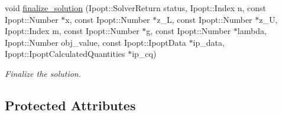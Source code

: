 \begin{DoxyCompactItemize}
void \mbox{\hyperlink{classSuperQuadric__NLP_a2f0b1fc45d42b0ee77c343ea7c227874}{finalize\+\_\+solution}} (Ipopt\+::\+Solver\+Return status, Ipopt\+::\+Index n, const Ipopt\+::\+Number $\ast$x, const Ipopt\+::\+Number $\ast$z\+\_\+L, const Ipopt\+::\+Number $\ast$z\+\_\+U, Ipopt\+::\+Index m, const Ipopt\+::\+Number $\ast$g, const Ipopt\+::\+Number $\ast$lambda, Ipopt\+::\+Number obj\+\_\+value, const Ipopt\+::\+Ipopt\+Data $\ast$ip\+\_\+data, Ipopt\+::\+Ipopt\+Calculated\+Quantities $\ast$ip\+\_\+cq)
\begin{DoxyCompactList}\small\item\em Finalize the solution. \end{DoxyCompactList}\end{DoxyCompactItemize}
\subsection*{Protected Attributes}
